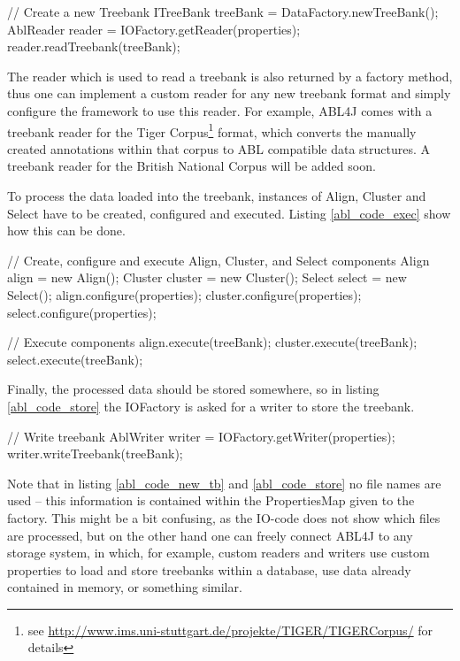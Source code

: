 \documentclass[12pt,a4paper]{article}
\newcommand{\link}[1]{\href{#1}{#1}}
\begin{document}
\begin{java} [caption={Creating a new Treebank},
label={abl_code_new_tb}] 
		// Create a new Treebank
		ITreeBank treeBank = DataFactory.newTreeBank();
		AblReader reader = IOFactory.getReader(properties);
		reader.readTreebank(treeBank);
\end{java}

The reader which is used to read a treebank is also returned by a factory method, thus one
can implement a custom reader for any new treebank format and simply configure
the framework to use this reader. For example, ABL4J comes with a treebank reader
for the Tiger Corpus\footnote{see
\link{http://www.ims.uni-stuttgart.de/projekte/TIGER/TIGERCorpus/} for details}
format, which converts the manually created annotations within that corpus to ABL
compatible data structures. A treebank reader for the British National Corpus
will be added soon.

To process the data loaded into the treebank, instances of Align, Cluster and
Select have to be created, configured and executed. Listing \ref{abl_code_exec}
show how this can be done.

\begin{java} [caption={Running ABL Components}, label={abl_code_exec}] 
		// Create, configure and execute Align, Cluster, and Select components
		Align align = new Align();
		Cluster cluster = new Cluster();
		Select select = new Select();
		align.configure(properties);
		cluster.configure(properties);
		select.configure(properties);
		
		// Execute components
		align.execute(treeBank);
		cluster.execute(treeBank);
		select.execute(treeBank);
\end{java}

Finally, the processed data should be stored somewhere, so in listing
\ref{abl_code_store} the IOFactory is asked for a writer to store the treebank.

\begin{java} [caption={Storing the new Treebank}, label={abl_code_store}] 
		// Write treebank
		AblWriter writer = IOFactory.getWriter(properties);
		writer.writeTreebank(treeBank);
\end{java}

Note that in listing \ref{abl_code_new_tb} and \ref{abl_code_store} no file
names are used -- this information is contained within the PropertiesMap given
to the factory. This might be a bit confusing, as the IO-code does not
show which files are processed, but on the other hand one can freely connect
ABL4J to any storage system, in which, for example, custom readers and writers
use custom properties to load and store treebanks within a database, use data
already contained in memory, or something similar.
\end{document}
